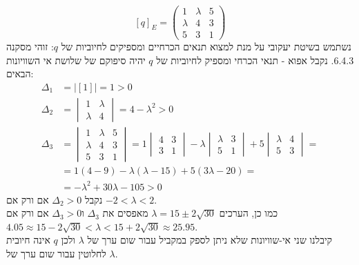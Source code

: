\documentclass{article}
\begin{document}
\[
    [q]_E = \begin{pmatrix}
        1       & \lambda & 5 \\
        \lambda & 4       & 3 \\
        5       & 3       & 1
    \end{pmatrix}
\]
נשתמש בשיטת יעקובי על מנת למצוא תנאים הכרחיים ומספיקים לחיוביות של $q$: זוהי מסקנה 6.4.3. נקבל אפוא - תנאי הכרחי ומספיק לחיוביות של $q$ יהיה סיפוקם של שלושת אי השוויונות הבאים:
\begin{align*}
    \Delta_1 & =|[1]|=1>0                                                            \\
    \Delta_2 & = \begin{vmatrix}
                     1       & \lambda \\
                     \lambda & 4
                 \end{vmatrix} = 4-\lambda^2>0                                       \\
    \Delta_3 & = \begin{vmatrix}
                     1       & \lambda & 5 \\
                     \lambda & 4       & 3 \\
                     5       & 3       & 1
                 \end{vmatrix} = 1\begin{vmatrix}
                                      4 & 3 \\
                                      3 & 1
                                  \end{vmatrix}-\lambda\begin{vmatrix}
                                                           \lambda & 3 \\
                                                           5       & 1
                                                       \end{vmatrix}+5\begin{vmatrix}
                                                                          \lambda & 4 \\
                                                                          5       & 3
                                                                      \end{vmatrix}= \\
             & = 1(4-9)-\lambda(\lambda-15)+5(3\lambda-20)=                          \\
             & = -\lambda^2+30\lambda-105 > 0
\end{align*}
נקבל $\Delta_2>0$ אם ורק אם $-2<\lambda<2$.\\
כמו כן, הערכים $\lambda=15\pm2\sqrt{30}$ מאפסים את $\Delta_3$ ו$\Delta_3>0$ אם ורק אם $4.05\approx 15-2\sqrt{30}<\lambda<15+2\sqrt{30}\approx25.95$.\\
קיבלנו שני אי-שוויונות שלא ניתן לספק במקביל עבור שום ערך של $\lambda$ ולכן $q$ אינה חיובית לחלוטין עבור שום ערך של $\lambda$.
\end{document}
